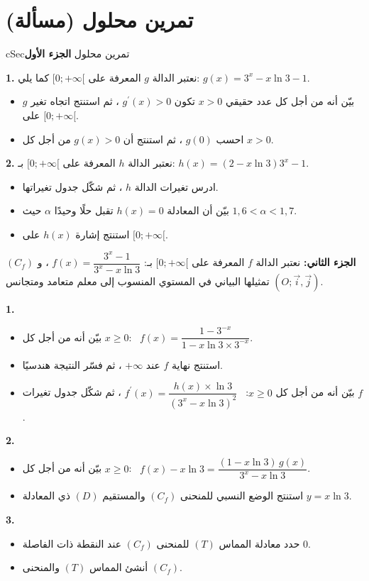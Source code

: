 \documentclass[12pt,a4paper]{article}
\newenvironment{BOX}[2]{\begin{otherlanguage}{english}\begin{arbox}{#1}{#2}}{\end{arbox}\end{otherlanguage}}
\newcounter{exo}
\newenvironment{sq}{\begin{itemize}[leftmargin=2.4em,itemsep=3pt]}{\end{itemize}}
\newcommand{\qa}{\item[(أ)]}\newcommand{\qb}{\item[(ب)]}\newcommand{\qc}{\item[(جـ)]}\newcommand{\qd}{\item[(د)]}\newcommand{\qe}{\item[(هـ)]}
\newcommand{\QQ}[1]{\par\smallskip\textbf{#1.} }
\newenvironment{tmr}{\stepcounter{exo}\begin{BOX}{cSec}{تمرين محلول \theexo}}{\end{BOX}}
\begin{document}
\section{تمرين محلول (مسألة)}
\begin{tmr}
\textbf{الجزء الأول}
\QQ{1} نعتبر الدالة $g$ المعرفة على $[0;+\infty[$ كما يلي: $g(x)=3^x-x\ln3-1$.
\begin{sq}
\qa بيّن أنه من أجل كل عدد حقيقي $x>0$ تكون $g^{\prime}(x)>0$ ، ثم استنتج اتجاه تغير $g$ على $[0;+\infty[$.
\qb احسب $g(0)$ ، ثم استنتج أن $g(x)>0$ من أجل كل $x>0$.
\end{sq}
\QQ{2} نعتبر الدالة $h$ المعرفة على $[0;+\infty[$ بـ: $h(x)=(2-x\ln3)3^x-1$.
\begin{sq}
\qa ادرس تغيرات الدالة $h$ ، ثم شكّل جدول تغيراتها.
\qb بيّن أن المعادلة $h(x)=0$ تقبل حلًا وحيدًا $\alpha$ حيث $1{,}6<\alpha<1{,}7$.
\qc استنتج إشارة $h(x)$ على $[0;+\infty[$.
\end{sq}
\textbf{الجزء الثاني:} نعتبر الدالة $f$ المعرفة على $[0;+\infty[$ بـ: $f(x)=\dfrac{3^x-1}{3^x-x\ln3}$ ، و $(C_f)$ تمثيلها البياني في المستوي المنسوب إلى معلم متعامد ومتجانس $(O;\vec i,\vec j)$.
\QQ{1}
\begin{sq}
\qa بيّن أنه من أجل كل $x\geqslant0$: \ $f(x)=\dfrac{1-3^{-x}}{1-x\ln3\times3^{-x}}$.
\qb استنتج نهاية $f$ عند $+\infty$ ، ثم فسّر النتيجة هندسيًا.
\qc بيّن أنه من أجل كل $x\geqslant0$: \ $f^{\prime}(x)=\dfrac{h(x)\times\ln3}{\left(3^x-x\ln3\right)^2}$ ، ثم شكّل جدول تغيرات $f$.
\end{sq}
\QQ{2}
\begin{sq}
\qa بيّن أنه من أجل كل $x\geqslant0$: \ $f(x)-x\ln3=\dfrac{(1-x\ln3)\,g(x)}{3^x-x\ln3}$.
\qb استنتج الوضع النسبي للمنحنى $(C_f)$ والمستقيم $(D)$ ذي المعادلة $y=x\ln3$.
\end{sq}
\QQ{3}
\begin{sq}
\qa حدد معادلة المماس $(T)$ للمنحنى $(C_f)$ عند النقطة ذات الفاصلة $0$.
\qb أنشئ المماس $(T)$ والمنحنى $(C_f)$.
\end{sq}
\end{tmr}
\end{document}
